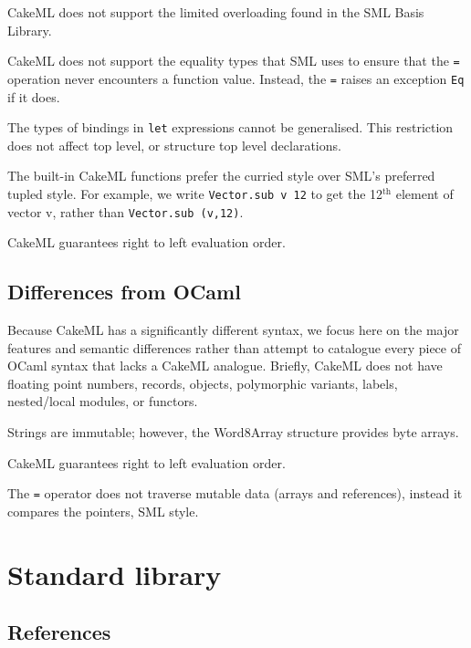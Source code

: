 \documentclass[12pt,a4paper]{book}
\begin{document}
CakeML does not support the limited overloading found in the SML Basis Library.

CakeML does not support the equality types that SML uses to ensure that the \texttt{=} operation never encounters a function value. Instead, the \texttt{=} raises an exception \texttt{Eq} if it does.

The types of bindings in \texttt{let} expressions cannot be generalised. This restriction does not affect top level, or structure top level declarations.

The built-in CakeML functions prefer the curried style over SML's preferred tupled style. For example, we write \texttt{Vector.sub v 12} to get the 12$^\textrm{th}$ element of vector v, rather than \texttt{Vector.sub (v,12)}.

CakeML guarantees right to left evaluation order.

\section{Differences from OCaml}

Because CakeML has a significantly different syntax, we focus here on the major features and semantic differences rather than attempt to catalogue every piece of OCaml syntax that lacks a CakeML analogue. Briefly, CakeML does not have floating point numbers, records, objects, polymorphic variants, labels, nested/local modules, or functors.

Strings are immutable; however, the Word8Array structure provides byte arrays.

CakeML guarantees right to left evaluation order.

The \texttt{=} operator does not traverse mutable data (arrays and references), instead it compares the pointers, SML style.

\chapter{Standard library}
\label{ch:stdlib}



\section{References}
\label{sect:refs}
\end{document}
